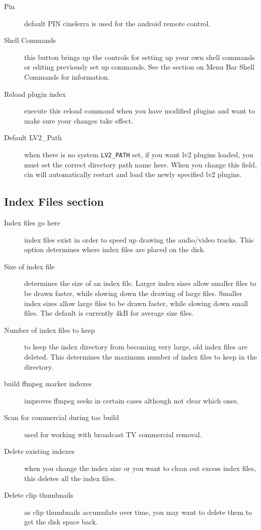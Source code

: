 \begin{description}
    \item[Pin] default PIN cinelerra is used for the android remote control.
    \item[Shell Commands] this button brings up the controls for setting up your own shell commands or editing previously set up commands.  See the section on Menu Bar Shell Commands for information.
    \item[Reload plugin index] execute this reload command when you have modified plugins and want to make sure your changes take effect.
    \item[Default LV2\_Path] when there is no system \texttt{LV2\_PATH} set, if you want lv2 plugins loaded, you must set the correct directory path name here. When you change this field, cin will automatically restart and load the newly specified lv2 plugins.
\end{description}

\subsection{Index Files section}%
\label{sub:index_file_section}

\begin{description}
    \item[Index files go here] index files exist in order to speed up drawing the audio/video tracks. This option determines where index files are placed on the disk.
    \item[Size of index file] determines the size of an index file. Larger index sizes allow smaller files to be drawn faster, while slowing down the drawing of large files. Smaller index sizes allow large files to be drawn faster, while slowing down small files.  The default is currently 4kB for average size files.
    \item[Number of index files to keep] to keep the index directory from becoming very large, old index files are deleted. This determines the maximum number of index files to keep in the directory.
    \item[build ffmpeg marker indexes] improves ffmpeg seeks in certain cases although not clear which ones.
    \item[Scan for commercial during toc build] used for working with broadcast TV commercial removal.
    \item[Delete existing indexes] when you change the index size or you want to clean out excess index files, this deletes all the index files.
    \item[Delete clip thumbnails] as clip thumbnails accumulate over time, you may want to delete them to get the disk space back.
\end{description}

